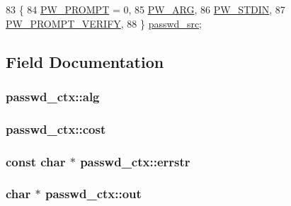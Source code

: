 \begin{DoxyCode}
83          \{
84         \hyperlink{structpasswd__ctx_a1cb4b707f844b91078a8a07dfb95394fac383443d90eb33ac2974262a9e023c74}{PW\_PROMPT} = 0,
85         \hyperlink{structpasswd__ctx_a1cb4b707f844b91078a8a07dfb95394fa7e4f1eaf780b78b2e48f15fe2c30fc92}{PW\_ARG},
86         \hyperlink{structpasswd__ctx_a1cb4b707f844b91078a8a07dfb95394fa83c2c0b1415768d01e85b2745ba49465}{PW\_STDIN},
87         \hyperlink{structpasswd__ctx_a1cb4b707f844b91078a8a07dfb95394faa94d10d17ee8fb9dad9a0aa0e56ae65a}{PW\_PROMPT\_VERIFY},
88     \} \hyperlink{structpasswd__ctx_af434e862f6290b980533858aa7627c99}{passwd\_src};
\end{DoxyCode}


\subsection{Field Documentation}
\subsubsection[{\texorpdfstring{alg}{alg}}]{ passwd\+\_\+ctx\+::alg}\hypertarget{structpasswd__ctx_a6f535584596964c51f398f1728b25c71}{}\label{structpasswd__ctx_a6f535584596964c51f398f1728b25c71}
\subsubsection[{\texorpdfstring{cost}{cost}}]{ passwd\+\_\+ctx\+::cost}\hypertarget{structpasswd__ctx_a54f34c48127cd3c115a7fa2fb23a089a}{}\label{structpasswd__ctx_a54f34c48127cd3c115a7fa2fb23a089a}
\subsubsection[{\texorpdfstring{errstr}{errstr}}]{\setlength{\rightskip}{0pt plus 5cm}const char $\ast$ passwd\+\_\+ctx\+::errstr}\hypertarget{structpasswd__ctx_ac138b422f243f942d99385910e813777}{}\label{structpasswd__ctx_ac138b422f243f942d99385910e813777}
\subsubsection[{\texorpdfstring{out}{out}}]{\setlength{\rightskip}{0pt plus 5cm}char $\ast$ passwd\+\_\+ctx\+::out}\hypertarget{structpasswd__ctx_a08a570cfa3f0a660479b64ec4a08d4b7}{}\label{structpasswd__ctx_a08a570cfa3f0a660479b64ec4a08d4b7}
